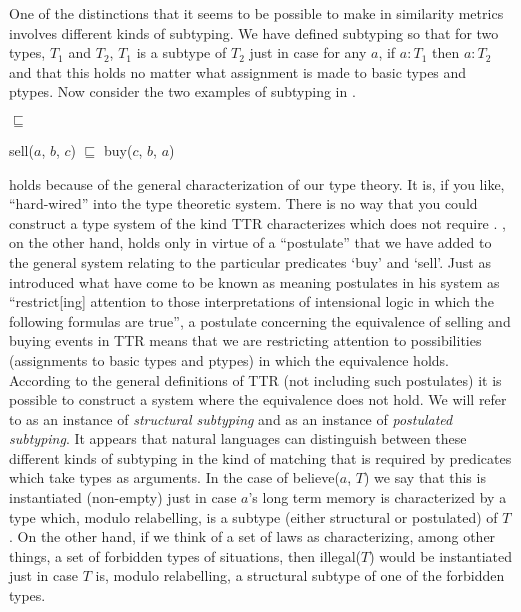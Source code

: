 One of the distinctions that it seems to be possible to make in
similarity metrics involves different kinds of subtyping.  We
have defined subtyping so that for two types, $T_1$ and $T_2$, $T_1$
is a subtype of $T_2$ just in case for any $a$, if $a:T_1$ then
$a:T_2$ and that this holds no matter what assignment is made to basic
types and ptypes.  Now consider the two
examples of subtyping in \nexteg{}.
\begin{ex} 
\begin{subex} 
 
\item {} $\sqsubseteq$ 
 
\item sell($a$, $b$, $c$) $\sqsubseteq$ buy($c$, $b$, $a$) 
 
\end{subex} 
   
\end{ex} 
 holds because of the general characterization of our type
theory.  It is, if you like, ``hard-wired'' into the type theoretic
system.  There is no way that you could construct a type system of the
kind TTR characterizes which does not require .  ,
on the other hand,  holds only in virtue of a ``postulate'' that we
have added to the general system relating to the particular predicates
`buy' and `sell'.  Just as \cite{Montague1973} introduced what have
come to be known as meaning postulates in his system as
``restrict[ing] attention to those interpretations of intensional
logic in which the following formulas are true'', a postulate
concerning the equivalence of selling and buying events in TTR means
that we are restricting attention to possibilities (assignments to
basic types and ptypes) in which the equivalence holds.  According to
the general definitions of TTR (not including such postulates) it is
possible to construct a system where the equivalence does not hold.
We will refer to  as an instance of \textit{structural
  subtyping} and  as an instance of \textit{postulated
  subtyping}.  It appears that natural languages can distinguish
between these different kinds of subtyping in the kind of matching
that is required by predicates which take types as arguments.  In the
case of believe($a$, $T$) we say that this is instantiated (non-empty)
just in case $a$'s long term memory is characterized by a type which,
modulo relabelling,
is a subtype (either structural or postulated) of $T$.  On the other
hand, if we think of a set of laws as characterizing, among other
things, a set of forbidden types of situations, then illegal($T$)
would be instantiated just in case $T$ is, modulo relabelling, a structural subtype of one of the
forbidden types. 

